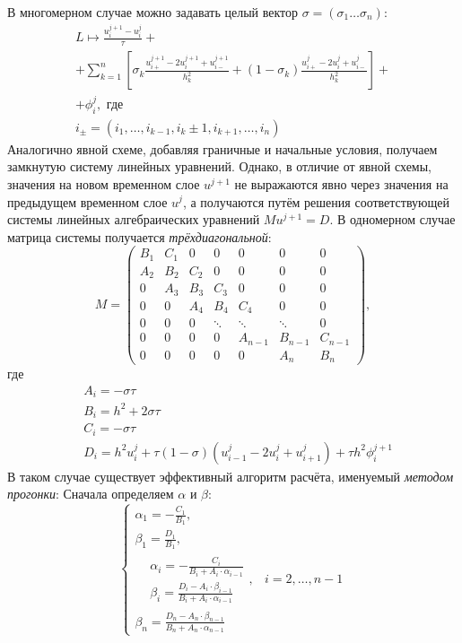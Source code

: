 В многомерном случае можно задавать целый вектор $\sigma = (\sigma_1 \ldots \sigma_n)$:
\begin{multline*}
    L \mapsto 
    \frac{u_i^{j + 1} - u_i^j}{\tau} + \\
    + \sum\limits_{k = 1}^{n} \left[ 
        \sigma_k\frac{u_{i+}^{j + 1} - 2u_i^{j + 1} + u_{i-}^{j + 1}}{h_k^2} +
        (1 - \sigma_k) \frac{u_{i+}^j - 2u_i^j + u_{i-}^j}{h_k^2}
    \right] +\\
    + \phi_i^j,\text{ где }\\
    i_{\pm} = (i_1, \ldots, i_{k - 1}, i_k \pm 1, i_{k + 1}, \ldots, i_n)
\end{multline*}
Аналогично явной схеме, добавляя граничные и начальные условия, получаем замкнутую систему линейных уравнений.
Однако, в отличие от явной схемы, значения на новом временном слое $u^{j + 1}$ не выражаются явно через значения на предыдущем временном слое $u^{j}$, а получаются путём решения соответствующей системы линейных алгебраических уравнений $M u^{j + 1} = D$.
В одномерном случае матрица системы получается \emph{трёхдиагональной}:
\begin{equation*}
    M = \begin{pmatrix}
        B_1 & C_1 & 0 & 0 & 0 & 0 & 0\\
        A_2 & B_2 & C_2 & 0 & 0 & 0 & 0\\
        0 & A_3 & B_3 & C_3 & 0 & 0 & 0\\
        0 & 0 & A_4 & B_4 & C_4 & 0 & 0\\
        0 & 0 & 0 & \ddots & \ddots & \ddots & 0\\
        0 & 0 & 0 & 0 & A_{n-1} & B_{n-1} & C_{n-1}\\
        0 & 0 & 0 & 0 & 0 & A_{n} & B_{n}
    \end{pmatrix},
\end{equation*}
где 
\begin{align*}
    & A_i = -\sigma \tau\\
    & B_i = h^2 + 2\sigma \tau\\
    & C_i = -\sigma \tau\\
    & D_i = h^2 u_i^j + \tau (1 - \sigma) \left( 
        u_{i - 1}^j - 2u_i^j + u_{i + 1}^j
     \right) + \tau h^2 \phi_i^{j + 1}
\end{align*}
В таком случае существует эффективный алгоритм расчёта, именуемый \emph{методом прогонки}:
Сначала определяем $\alpha$ и $\beta$:
$$
    \begin{cases}
        \alpha_1 = -\frac{C_1}{B_1}, \\
        \beta_1 = \frac{D_1}{B_1}, \\
        \begin{aligned}
            & \alpha_i = -\frac{C_i}{B_i + A_i \cdot \alpha_{i-1}}\\
            & \beta_i = \frac{D_i - A_i \cdot \beta_{i-1}}{B_i + A_i \cdot \alpha_{i-1}}
        \end{aligned}, & i = 2, \ldots, n-1\\
        \beta_n = \frac{D_n - A_n \cdot \beta_{n-1}}{B_n + A_n \cdot \alpha_{n-1}}
    \end{cases}
$$
